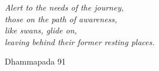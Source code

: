 \cleartorecto
\thispagestyle{empty}

\mbox{}\vfill

\hspace*{5mm}%
\begin{minipage}{\linewidth - 10mm}%
\setlength{\parskip}{5pt}%
\raggedright
\itshape
Alert to the needs of the journey,\\
those on the path of awareness,\\
like swans, glide on,\\
leaving behind their former resting places.

Dhammapada 91
\end{minipage}

\vfill\mbox{}